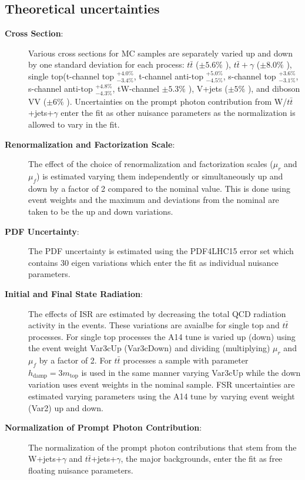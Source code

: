 \subsection{Theoretical uncertainties}
\begin{description}
\item[\textbf{Cross Section}:]  Various cross sections for MC samples are separately varied up and down by one standard deviation for each process: $t\bar{t}$ ($\pm5.6\%$ \cite{ttXSec}), $t\bar{t}+\gamma$ ($\pm 8.0\%$ \cite{ATLAS:2018pmj}), single top(t-channel top $^{+4.0\%}_{-3.4\%}$, t-channel anti-top $^{+5.0\%}_{-4.5\%}$, s-channel top $^{+3.6\%}_{-3.1\%}$, s-channel anti-top $^{+4.8\%}_{-4.3\%}$, tW-channel $\pm 5.3\%$ \cite{SingleTopXSec}), V+jets ($\pm5\%$ \cite{VXSec}), and diboson VV ($\pm 6\%$ \cite{VXSec}).  Uncertainties on the prompt photon contribution from W/$t\bar{t}$+jets+$\gamma$ enter the fit as other nuisance parameters as the normalization is allowed to vary in the fit.

\item[\textbf{Renormalization and Factorization Scale}:]  The effect of the choice of renormalization and factorization scales ($\mu_r$ and $\mu_f$) is estimated varying them independently or simultaneously up and down by a factor of 2 compared to the nominal value.  This is done using event weights and the maximum and deviations from the nominal are taken to be the up and down variations.

\item[\textbf{PDF Uncertainty}:]  The PDF uncertainty is estimated using the PDF4LHC15 error set which contains 30 eigen variations which enter the fit as individual nuisance parameters.

\item[\textbf{Initial and Final State Radiation}:] The effects of ISR are estimated by decreasing the total QCD radiation activity in the events.  These variations are avaialbe for single top and $t\bar{t}$ processes.  For single top processes the A14 tune is varied up (down) using the event weight Var3cUp (Var3cDown) and dividing (multiplying) $\mu_r$ and $\mu_f$ by a factor of 2.  For $t\bar{t}$ processes a sample with parameter $h_\text{damp}=3m_\text{top}$ is used in the same manner varying Var3cUp while the down variation uses event weights in the nominal sample.   FSR uncertainties are estimated varying parameters using the A14 tune by varying event weight (Var2) up and down. %

\item[\textbf{Normalization of Prompt Photon Contribution}:]  The normalization of the prompt photon contributions that stem from the W+jets+$\gamma$ and $t\bar{t}$+jets+$\gamma$, the major backgrounds, enter the fit as free floating nuisance parameters.


\end{description}
